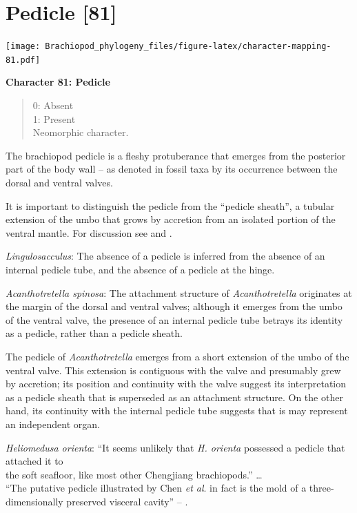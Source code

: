 \documentclass[]{book}
\theoremstyle{definition}
\theoremstyle{definition}
\theoremstyle{definition}
\theoremstyle{remark}
\begin{document}
\hypertarget{pedicle-81}{%
\section{Pedicle {[}81{]}}\label{pedicle-81}}

\texttt{[image: Brachiopod\_phylogeny\_files/figure-latex/character-mapping-81.pdf]}

\textbf{Character 81: Pedicle}

\begin{quote}
0: Absent\\
1: Present\\
Neomorphic character.
\end{quote}

The brachiopod pedicle is a fleshy protuberance that emerges from the
posterior part of the body wall -- as denoted in fossil taxa by its
occurrence between the dorsal and ventral valves.

It is important to distinguish the pedicle from the ``pedicle sheath'',
a tubular extension of the umbo that grows by accretion from an isolated
portion of the ventral mantle. For discussion see
\citet{Holmer2018Theattachment} and \citet{Bassett2017Earliestontogeny}.

\emph{Lingulosacculus}: The absence of a pedicle is inferred from the
absence of an internal pedicle tube, and the absence of a pedicle at the
hinge.

\emph{Acanthotretella spinosa}: The attachment structure of
\emph{Acanthotretella} originates at the margin of the dorsal and
ventral valves; although it emerges from the umbo of the ventral valve,
the presence of an internal pedicle tube betrays its identity as a
pedicle, rather than a pedicle sheath.

The pedicle of \emph{Acanthotretella} emerges from a short extension of
the umbo of the ventral valve. This extension is contiguous with the
valve and presumably grew by accretion; its position and continuity with
the valve suggest its interpretation as a pedicle sheath that is
superseded as an attachment structure. On the other hand, its continuity
with the internal pedicle tube suggests that is may represent an
independent organ.

\emph{Heliomedusa orienta}: ``It seems unlikely that \emph{H. orienta}
possessed a pedicle that attached it to\\
the soft seafloor, like most other Chengjiang brachiopods.'' \ldots{}\\
``The putative pedicle illustrated by Chen \emph{et al}.
\citeyearpar[Figs 4, 6, 7]{Chen2007Reinterpretationof} in fact is the
mold of a three-dimensionally preserved visceral cavity'' --
\citet{Zhang2009Architectureand}.
\end{document}

